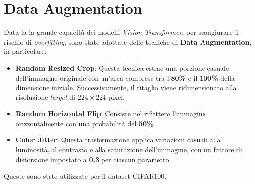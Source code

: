 \section{Data Augmentation}
Data la la grande capacità dei modelli \textit{Vision Transformer}, per
scongiurare il rischio di \textit{overfitting}, sono state adottate delle
tecniche di \textbf{Data Augmentation}, in particolare:
\begin{itemize}
    \item \textbf{Random Resized Crop}: Questa tecnica estrae una porzione casuale dell'immagine originale con un'area compresa tra l'\textbf{80\%} e il \textbf{100\%} della dimensione iniziale. Successivamente, il ritaglio viene ridimensionato alla risoluzione \textit{target} di \textbf{$224 \times 224$} pixel.
    \item \textbf{Random Horizontal Flip}: Consiste nel riflettere l'immagine orizzontalmente con una probabilità del \textbf{50\%}.
    \item \textbf{Color Jitter}: Questa trasformazione applica variazioni casuali alla luminosità, al contrasto e alla saturazione dell'immagine, con un fattore di distorsione impostato a \textbf{0.3} per ciascun parametro.
\end{itemize}
Queste sono state utilizzate per il dataset CIFAR100.

